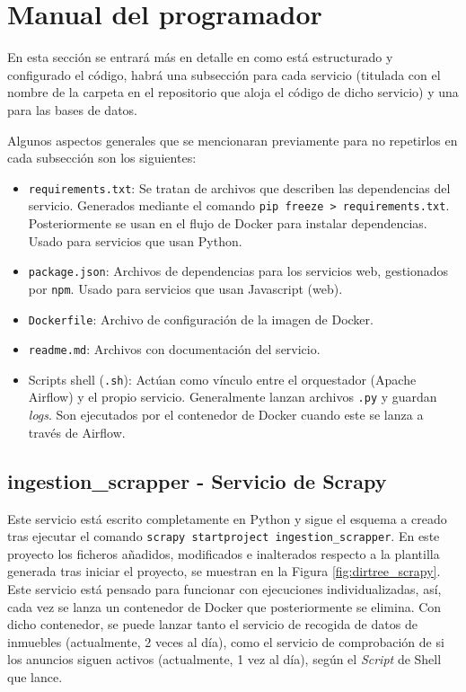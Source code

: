 \clearpage
\section{Manual del programador}

En esta sección se entrará más en detalle en como está estructurado y configurado el código, habrá una subsección para cada servicio (titulada con el nombre de la carpeta en el repositorio que aloja el código de dicho servicio) y una para las bases de datos.

Algunos aspectos generales que se mencionaran previamente para no repetirlos en cada subsección son los siguientes:

\begin{itemize}
    \item \texttt{requirements.txt}: Se tratan de archivos que describen las dependencias del servicio. Generados mediante el comando \texttt{pip freeze > requirements.txt}. Posteriormente se usan en el flujo de Docker para instalar dependencias. Usado para servicios que usan Python.
    \item \texttt{package.json}: Archivos de dependencias para los servicios web, gestionados por \texttt{npm}. Usado para servicios que usan Javascript (web).
    \item \texttt{Dockerfile}: Archivo de configuración de la imagen de Docker.
    \item \texttt{readme.md}: Archivos con documentación del servicio.
    \item Scripts shell (\texttt{.sh}): Actúan como vínculo entre el orquestador (Apache Airflow) y el propio servicio. Generalmente lanzan archivos \texttt{.py} y guardan \textit{logs}. Son ejecutados por el contenedor de Docker cuando este se lanza a través de Airflow.
\end{itemize}

\clearpage
\subsection{ingestion\_scrapper - Servicio de Scrapy}

Este servicio está escrito completamente en Python y sigue el esquema a creado tras ejecutar el comando \texttt{scrapy startproject ingestion\_scrapper}. En este proyecto los ficheros añadidos, modificados e inalterados respecto a la plantilla generada tras iniciar el proyecto, se muestran en la Figura \ref{fig:dirtree_scrapy}. Este servicio está pensado para funcionar con ejecuciones individualizadas, así, cada vez se lanza un contenedor de Docker que posteriormente se elimina. Con dicho contenedor, se puede lanzar tanto el servicio de recogida de datos de inmuebles (actualmente, 2 veces al día), como el servicio de comprobación de si los anuncios siguen activos (actualmente, 1 vez al día), según el \textit{Script} de Shell que lance.

